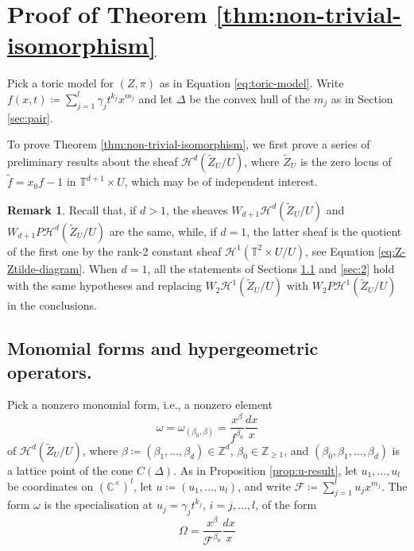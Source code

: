 \documentclass[11pt, reqno]{amsart}
\theoremstyle{plain}
\theoremstyle{definition}
\newtheorem{rem}[thm]{Remark}
\newcommand{\ZZ}{\mathbb{Z}}
\newcommand{\TT}{\mathbb{T}}
\newcommand{\Gm}{{\mathbb{C}^\times}}
\begin{document}
\section{Proof of Theorem \ref{thm:non-trivial-isomorphism}} 
\label{sec:proof-thm-1}
Pick a toric model for $(Z,\pi)$ as in Equation \eqref{eq:toric-model}.   
Write 
$
f(x,t)\coloneqq \sum_{j=1}^l \gamma_j t^{k_j} x^{m_j}$ and let $\Delta$ be the convex hull of the $m_j$ as in Section \ref{sec:pair}. 

To prove Theorem \ref{thm:non-trivial-isomorphism}, we first prove a series of preliminary results about the sheaf $\mathcal{H}^d(\widetilde{Z}_U/U)$, where $\widetilde{Z}_U$ is the zero locus of 
$\widetilde{f}=x_0f-1$ in $\TT^{d+1} \times U$, which may be of independent interest.



\begin{rem}
\label{rem:primitive}
Recall that, if $d>1$, the sheaves $W_{d+1} 
\mathcal{H}^d(\widetilde{Z}_U/U)$ and $W_{d+1} 
P\mathcal{H}^d(\widetilde{Z}_U/U)$ are the same, while, if $d=1$, the latter sheaf is the quotient of the first one by the rank-2 constant sheaf $\mathcal{H}^1(\TT^{2} \times U/U)$, see Equation \eqref{eq:Z-Ztilde-diagram}. When $d=1$, all the statements of Sections  \ref{sec:1} and  \ref{sec:2} hold with the same hypotheses and replacing $W_{2}
\mathcal{H}^1(\widetilde{Z}_U/U)$ with $W_{2} 
P\mathcal{H}^1(\widetilde{Z}_U/U)$ in the conclusions. 
\end{rem}

\subsection{Monomial forms and hypergeometric operators.} 
\label{sec:1} 
Pick a nonzero monomial form, i.e., a nonzero element
\begin{equation} \label{eq:mono-form-step1}
\omega= \omega_{(\beta_0, \beta)}=\frac{x^\beta}{f^{\beta_0}} \frac{dx}{x} 
\end{equation}
 of $\mathcal{H}^d(\widetilde{Z}_U/U)$, where 
$\beta\coloneqq (\beta_1, \dots, \beta_d) \in \ZZ^d$, $\beta_0 \in \ZZ_{\geq 1}$, and $(\beta_0, \beta_1, \dots, \beta_d)$ is a lattice point of the cone $C(\Delta)$. 
As in Proposition \ref{prop:u-result}, let $u_1, \dots , u_l$ be coordinates on $(\Gm)^l$, let $u \coloneqq (u_1, \dots, u_l)$, and write $\mathcal{F}\coloneqq \sum_{j=1}^l u_j x^{m_j}$.
The form $\omega$ is the specialisation at $u_j=\gamma_jt^{k_j}$, $i=j, \dots, l$, of the form 
\begin{equation}
\label{eq:mono-form-u}
\Omega= \frac{x^\beta}{\mathcal{F}^{\beta_0}} \frac{dx}{x}   
\end{equation}
\end{document}
